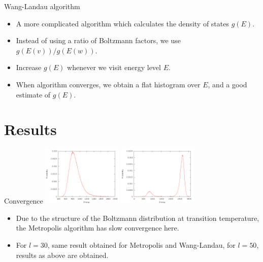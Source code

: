 \documentclass{beamer}
\begin{document}
\begin{frame}{Wang-Landau algorithm}
    \begin{itemize}
        \item A more complicated algorithm which calculates the density of states $g(E)$.
        \item Instead of using a ratio of Boltzmann factors, we use $g(E(v))/g(E(w))$.
        \item Increase $g(E)$ whenever we visit energy level $E$.
        \item When algorithm converges, we obtain a flat histogram over $E$, and a good estimate of $g(E)$.
    \end{itemize}
\end{frame}
\section{Results}
\begin{frame}{Convergence}
    \includegraphics[width=1.5in]{../results/metropolis/m50.png}
    \includegraphics[width=1.5in]{../results/wanglandau/b50.png}
    \begin{itemize}
        \item Due to the structure of the Boltzmann distribution at transition temperature, the Metropolis algorithm has slow convergence here.
        \item For $l = 30$, same result obtained for Metropolis and Wang-Landau, for $l = 50$, results as above are obtained.
    \end{itemize}
\end{frame}
\end{document}
